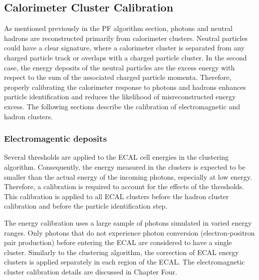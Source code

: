 \subsection{Calorimeter Cluster Calibration}
\label{subsec:calibration}
As mentioned previously in the PF algorithm section, photons and neutral hadrons are reconstructed primarily from calorimeter clusters.
Neutral particles could have a clear signature, where a calorimeter cluster is separated from any charged particle track or overlaps with a charged particle cluster.
In the second case, the energy deposits of the neutral particles are the excess energy with respect to the sum of the associated charged particle momenta.
Therefore, properly calibrating the calorimeter response to photons and hadrons enhances particle identification and reduces the likelihood of misreconstructed energy excess.
The following sections describe the calibration of electromagnetic and hadron clusters.

\subsubsection{Electromagentic deposits}
Several thresholds are applied to the ECAL cell energies in the clustering algorithm.
Consequently, the energy measured in the clusters is expected to be smaller than the actual energy of the incoming photons, especially at low energy.
Therefore, a calibration is required to account for the effects of the thresholds.
This calibration is applied to all ECAL clusters before the hadron cluster calibration and before the particle identification step.

The energy calibration uses a large sample of photons simulated in varied energy ranges.
Only photons that do not experience photon conversion (electron-positron pair production) before entering the ECAL are considered to have a single cluster.
Similarly to the clustering algorithm, the correction of ECAL energy clusters is applied separately in each region of the ECAL.
The electromagnetic cluster calibration details are discussed in Chapter Four. 



